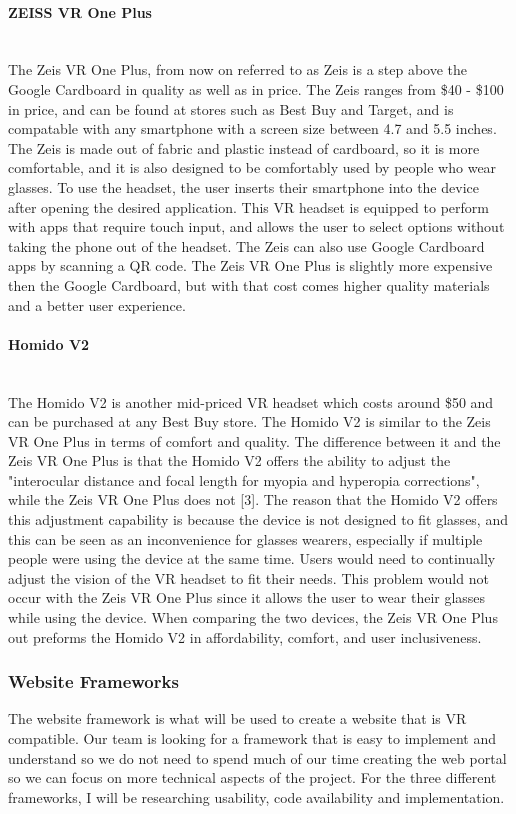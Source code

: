 \documentclass[onecolumn, draftclsnofoot,10pt, compsoc]{IEEEtran}
\begin{document}
    \paragraph{ZEISS VR One Plus} \\
    The Zeis VR One Plus, from now on referred to as Zeis is a step above the Google Cardboard in quality as well as in price.
    The Zeis ranges from \$40 - \$100 in price, and can be found at stores such as Best Buy and Target, and is compatable with any smartphone with a screen size between 4.7 and 5.5 inches.
    The Zeis is made out of fabric and plastic instead of cardboard, so it is more comfortable, and it is also designed to be comfortably used by people who wear glasses.
    To use the headset, the user inserts their smartphone into the device after opening the desired application.
    This VR headset is equipped to perform with apps that require touch input, and allows the user to select options without taking the phone out of the headset.
    The Zeis can also use Google Cardboard apps by scanning a QR code.
    The Zeis VR One Plus is slightly more expensive then the Google Cardboard, but with that cost comes higher quality materials and a better user experience.

    \paragraph{Homido V2} \\
    The Homido V2 is another mid-priced VR headset which costs around \$50 and can be purchased at any Best Buy store.
    The Homido V2 is similar to the Zeis VR One Plus in terms of comfort and quality.
    The difference between it and the Zeis VR One Plus is that the Homido V2 offers the ability to adjust the "interocular distance and focal length for myopia and hyperopia corrections", while the Zeis VR One Plus does not [3].
    The reason that the Homido V2 offers this adjustment capability is because the device is not designed to fit glasses, and this can be seen as an inconvenience for glasses wearers, especially if multiple people were using the device at the same time.
    Users would need to continually adjust the vision of the VR headset to fit their needs.
    This problem would not occur with the Zeis VR One Plus since it allows the user to wear their glasses while using the device.
    When comparing the two devices, the Zeis VR One Plus out preforms the Homido V2 in affordability, comfort, and user inclusiveness. 
    
\subsubsection{Website Frameworks} 
    The website framework is what will be used to create a website that is VR compatible.
    Our team is looking for a framework that is easy to implement and understand so we do not need to spend much of our time creating the web portal so we can focus on more technical aspects of the project. 
    For the three different frameworks, I will be researching usability, code availability and implementation.
    
\end{document}
